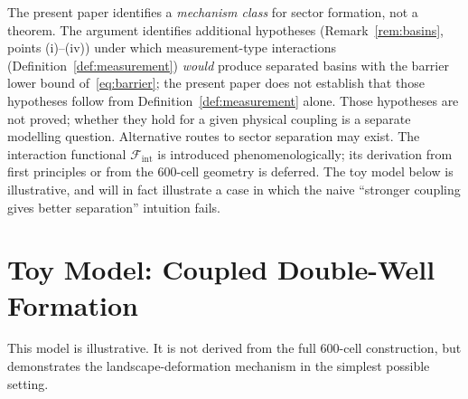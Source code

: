 \documentclass[12pt]{article}
\newcommand{\Fcal}{\mathcal{F}}
\begin{document}
The present paper identifies a \textit{mechanism class} for sector formation, not a theorem. The argument identifies additional hypotheses (Remark~\ref{rem:basins}, points (i)--(iv)) under which measurement-type interactions (Definition~\ref{def:measurement}) \emph{would} produce separated basins with the barrier lower bound of~\eqref{eq:barrier}; the present paper does not establish that those hypotheses follow from Definition~\ref{def:measurement} alone. Those hypotheses are not proved; whether they hold for a given physical coupling is a separate modelling question. Alternative routes to sector separation may exist. The interaction functional $\Fcal_{\mathrm{int}}$ is introduced phenomenologically; its derivation from first principles or from the 600-cell geometry is deferred. The toy model below is illustrative, and will in fact illustrate a case in which the naive ``stronger coupling gives better separation'' intuition fails.

\section{Toy Model: Coupled Double-Well Formation}\label{sec:toy}

This model is illustrative. It is not derived from the full 600-cell construction, but demonstrates the landscape-deformation mechanism in the simplest possible setting.
\end{document}
